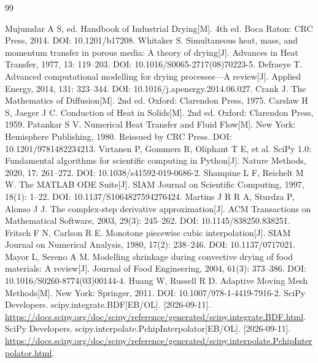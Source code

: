 \begin{thebibliography}{99}
\small\raggedright\setlength{\itemsep}{6pt}
Mujumdar A S, ed. Handbook of Industrial Drying[M]. 4th ed. Boca Raton: CRC Press, 2014. DOI: 10.1201/b17208.
Whitaker S. Simultaneous heat, mass, and momentum transfer in porous media: A theory of drying[J]. Advances in Heat Transfer, 1977, 13: 119--203. DOI: 10.1016/S0065-2717(08)70223-5.
Defraeye T. Advanced computational modelling for drying processes---A review[J]. Applied Energy, 2014, 131: 323--344. DOI: 10.1016/j.apenergy.2014.06.027.
Crank J. The Mathematics of Diffusion[M]. 2nd ed. Oxford: Clarendon Press, 1975.
Carslaw H S, Jaeger J C. Conduction of Heat in Solids[M]. 2nd ed. Oxford: Clarendon Press, 1959.
Patankar S V. Numerical Heat Transfer and Fluid Flow[M]. New York: Hemisphere Publishing, 1980. Reissued by CRC Press. DOI: 10.1201/9781482234213.
Virtanen P, Gommers R, Oliphant T E, et al. SciPy 1.0: Fundamental algorithms for scientific computing in Python[J]. Nature Methods, 2020, 17: 261--272. DOI: 10.1038/s41592-019-0686-2.
Shampine L F, Reichelt M W. The MATLAB ODE Suite[J]. SIAM Journal on Scientific Computing, 1997, 18(1): 1--22. DOI: 10.1137/S1064827594276424.
Martins J R R A, Sturdza P, Alonso J J. The complex-step derivative approximation[J]. ACM Transactions on Mathematical Software, 2003, 29(3): 245--262. DOI: 10.1145/838250.838251.
Fritsch F N, Carlson R E. Monotone piecewise cubic interpolation[J]. SIAM Journal on Numerical Analysis, 1980, 17(2): 238--246. DOI: 10.1137/0717021.
Mayor L, Sereno A M. Modelling shrinkage during convective drying of food materials: A review[J]. Journal of Food Engineering, 2004, 61(3): 373--386. DOI: 10.1016/S0260-8774(03)00144-4.
Huang W, Russell R D. Adaptive Moving Mesh Methods[M]. New York: Springer, 2011. DOI: 10.1007/978-1-4419-7916-2.
SciPy Developers. scipy.integrate.BDF[EB/OL]. [2026-09-11].
\url{https://docs.scipy.org/doc/scipy/reference/generated/scipy.integrate.BDF.html}.
SciPy Developers. scipy.interpolate.PchipInterpolator[EB/OL]. [2026-09-11].
\url{https://docs.scipy.org/doc/scipy/reference/generated/scipy.interpolate.PchipInterpolator.html}.
\end{thebibliography}
